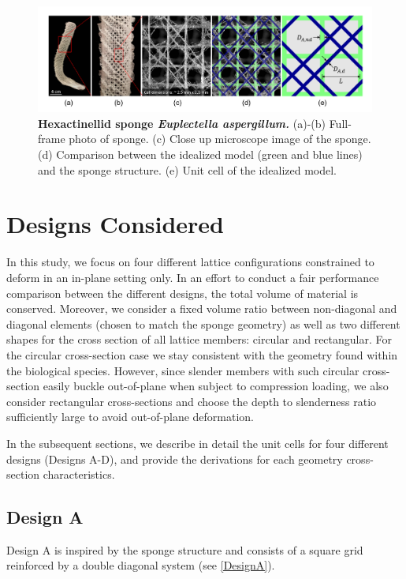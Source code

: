 \documentclass[10pt,twoside]{fernandes_supp}
\begin{document}
\begin{figure}[H]
    \centering
    \includegraphics[width=0.9\linewidth]{SFig1.png}
    \caption{\textbf{Hexactinellid sponge \textit{Euplectella aspergillum.}} (a)-(b) Full-frame photo of sponge.  (c)  Close up microscope image of the sponge. (d) Comparison between the idealized model (green and blue lines) and the sponge structure. (e) Unit cell of the idealized model.}
    \label{Sponge}
\end{figure}

\section{Designs Considered}\label{sec:designs}
In this study, we focus on four different lattice configurations constrained to deform in an in-plane setting only. In an effort to conduct a fair performance comparison between the different designs, the total volume of material is conserved. Moreover,  we consider a fixed volume ratio between non-diagonal and diagonal elements (chosen to match the sponge geometry) as well as two different shapes for the cross section of all lattice members: circular and rectangular.  For the circular cross-section case  we stay consistent with the geometry found within the biological species. However, since slender members with such circular cross-section easily buckle out-of-plane when subject to compression loading, we also consider  rectangular cross-sections and choose the depth to slenderness ratio  sufficiently large to avoid out-of-plane deformation. 

In the subsequent sections, we describe in detail the unit cells for four different designs (Designs A-D), and provide the derivations for each geometry cross-section characteristics. 

\subsection{Design A}
Design A is inspired by the sponge structure and consists of a square grid  reinforced by a double diagonal system (see \cref{DesignA}). 
\end{document}
